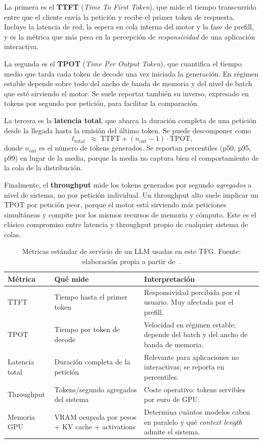 \documentclass[11pt,a4paper]{article}
\begin{document}
La primera es el \textbf{TTFT} (\textit{Time To First Token}), que mide el tiempo transcurrido entre que el cliente envía la petición y recibe el primer token de respuesta. Incluye la latencia de red, la espera en cola interna del motor y la fase de prefill, y es la métrica que más pesa en la percepción de \textit{responsividad} de una aplicación interactiva.

La segunda es el \textbf{TPOT} (\textit{Time Per Output Token}), que cuantifica el tiempo medio que tarda cada token de decode una vez iniciada la generación. En régimen estable depende sobre todo del ancho de banda de memoria y del nivel de batch que esté sirviendo el motor. Se suele reportar también su inverso, expresado en tokens por segundo por petición, para facilitar la comparación.

La tercera es la \textbf{latencia total}, que abarca la duración completa de una petición desde la llegada hasta la emisión del último token. Se puede descomponer como
\[
\ell_{\text{total}} \;\approx\; \text{TTFT} + (n_{\text{out}} - 1)\cdot \text{TPOT},
\]
donde $n_{\text{out}}$ es el número de tokens generados. Se reportan percentiles (p50, p95, p99) en lugar de la media, porque la media no captura bien el comportamiento de la cola de la distribución.

Finalmente, el \textbf{throughput} mide los tokens generados por segundo \emph{agregados} a nivel de sistema, no por petición individual. Un throughput alto suele implicar un TPOT por petición peor, porque el motor está sirviendo más peticiones simultáneas y compite por los mismos recursos de memoria y cómputo. Este es el clásico compromiso entre latencia y throughput propio de cualquier sistema de colas.

\begin{table}[H]
\centering
\caption{Métricas estándar de servicio de un LLM usadas en este TFG. Fuente: elaboración propia a partir de~\cite{vllm2023, vllm-docs}.}
\label{tab:metricas-servicio}
\footnotesize
\begin{tabularx}{\textwidth}{>{\raggedright\arraybackslash}p{2.4cm} >{\raggedright\arraybackslash}X >{\raggedright\arraybackslash}p{4cm}}
\toprule
\textbf{Métrica} & \textbf{Qué mide} & \textbf{Interpretación} \\
\midrule
TTFT & Tiempo hasta el primer token & Responsividad percibida por el usuario. Muy afectada por el prefill. \\
\addlinespace
TPOT & Tiempo por token de decode & Velocidad en régimen estable; depende del batch y del ancho de banda de memoria. \\
\addlinespace
Latencia total & Duración completa de la petición & Relevante para aplicaciones no interactivas; se reporta en percentiles. \\
\addlinespace
Throughput & Tokens/segundo agregados del sistema & Coste operativo: tokens servibles por euro de GPU. \\
\addlinespace
Memoria GPU & VRAM ocupada por pesos + KV cache + activations & Determina cuántos modelos caben en paralelo y qué \textit{context length} admite el sistema. \\
\bottomrule
\end{tabularx}
\end{table}
\end{document}
